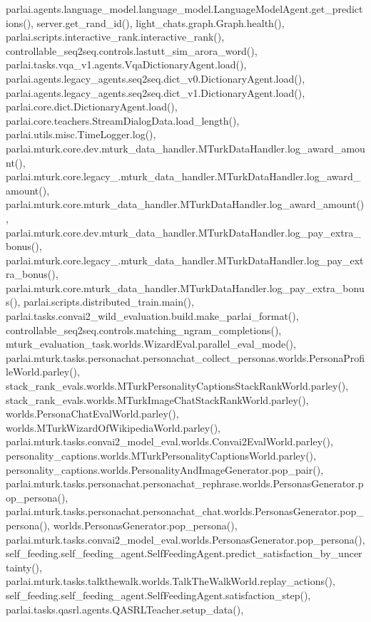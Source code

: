 parlai.\+agents.\+language\+\_\+model.\+language\+\_\+model.\+Language\+Model\+Agent.\+get\+\_\+predictions(), server.\+get\+\_\+rand\+\_\+id(), light\+\_\+chats.\+graph.\+Graph.\+health(), parlai.\+scripts.\+interactive\+\_\+rank.\+interactive\+\_\+rank(), controllable\+\_\+seq2seq.\+controls.\+lastutt\+\_\+sim\+\_\+arora\+\_\+word(), parlai.\+tasks.\+vqa\+\_\+v1.\+agents.\+Vqa\+Dictionary\+Agent.\+load(), parlai.\+agents.\+legacy\+\_\+agents.\+seq2seq.\+dict\+\_\+v0.\+Dictionary\+Agent.\+load(), parlai.\+agents.\+legacy\+\_\+agents.\+seq2seq.\+dict\+\_\+v1.\+Dictionary\+Agent.\+load(), parlai.\+core.\+dict.\+Dictionary\+Agent.\+load(), parlai.\+core.\+teachers.\+Stream\+Dialog\+Data.\+load\+\_\+length(), parlai.\+utils.\+misc.\+Time\+Logger.\+log(), parlai.\+mturk.\+core.\+dev.\+mturk\+\_\+data\+\_\+handler.\+M\+Turk\+Data\+Handler.\+log\+\_\+award\+\_\+amount(), parlai.\+mturk.\+core.\+legacy\+\_.\+mturk\+\_\+data\+\_\+handler.\+M\+Turk\+Data\+Handler.\+log\+\_\+award\+\_\+amount(), parlai.\+mturk.\+core.\+mturk\+\_\+data\+\_\+handler.\+M\+Turk\+Data\+Handler.\+log\+\_\+award\+\_\+amount(), parlai.\+mturk.\+core.\+dev.\+mturk\+\_\+data\+\_\+handler.\+M\+Turk\+Data\+Handler.\+log\+\_\+pay\+\_\+extra\+\_\+bonus(), parlai.\+mturk.\+core.\+legacy\+\_.\+mturk\+\_\+data\+\_\+handler.\+M\+Turk\+Data\+Handler.\+log\+\_\+pay\+\_\+extra\+\_\+bonus(), parlai.\+mturk.\+core.\+mturk\+\_\+data\+\_\+handler.\+M\+Turk\+Data\+Handler.\+log\+\_\+pay\+\_\+extra\+\_\+bonus(), parlai.\+scripts.\+distributed\+\_\+train.\+main(), parlai.\+tasks.\+convai2\+\_\+wild\+\_\+evaluation.\+build.\+make\+\_\+parlai\+\_\+format(), controllable\+\_\+seq2seq.\+controls.\+matching\+\_\+ngram\+\_\+completions(), mturk\+\_\+evaluation\+\_\+task.\+worlds.\+Wizard\+Eval.\+parallel\+\_\+eval\+\_\+mode(), parlai.\+mturk.\+tasks.\+personachat.\+personachat\+\_\+collect\+\_\+personas.\+worlds.\+Persona\+Profile\+World.\+parley(), stack\+\_\+rank\+\_\+evals.\+worlds.\+M\+Turk\+Personality\+Captions\+Stack\+Rank\+World.\+parley(), stack\+\_\+rank\+\_\+evals.\+worlds.\+M\+Turk\+Image\+Chat\+Stack\+Rank\+World.\+parley(), worlds.\+Persona\+Chat\+Eval\+World.\+parley(), worlds.\+M\+Turk\+Wizard\+Of\+Wikipedia\+World.\+parley(), parlai.\+mturk.\+tasks.\+convai2\+\_\+model\+\_\+eval.\+worlds.\+Convai2\+Eval\+World.\+parley(), personality\+\_\+captions.\+worlds.\+M\+Turk\+Personality\+Captions\+World.\+parley(), personality\+\_\+captions.\+worlds.\+Personality\+And\+Image\+Generator.\+pop\+\_\+pair(), parlai.\+mturk.\+tasks.\+personachat.\+personachat\+\_\+rephrase.\+worlds.\+Personas\+Generator.\+pop\+\_\+persona(), parlai.\+mturk.\+tasks.\+personachat.\+personachat\+\_\+chat.\+worlds.\+Personas\+Generator.\+pop\+\_\+persona(), worlds.\+Personas\+Generator.\+pop\+\_\+persona(), parlai.\+mturk.\+tasks.\+convai2\+\_\+model\+\_\+eval.\+worlds.\+Personas\+Generator.\+pop\+\_\+persona(), self\+\_\+feeding.\+self\+\_\+feeding\+\_\+agent.\+Self\+Feeding\+Agent.\+predict\+\_\+satisfaction\+\_\+by\+\_\+uncertainty(), parlai.\+mturk.\+tasks.\+talkthewalk.\+worlds.\+Talk\+The\+Walk\+World.\+replay\+\_\+actions(), self\+\_\+feeding.\+self\+\_\+feeding\+\_\+agent.\+Self\+Feeding\+Agent.\+satisfaction\+\_\+step(), parlai.\+tasks.\+qasrl.\+agents.\+Q\+A\+S\+R\+L\+Teacher.\+setup\+\_\+data(), 